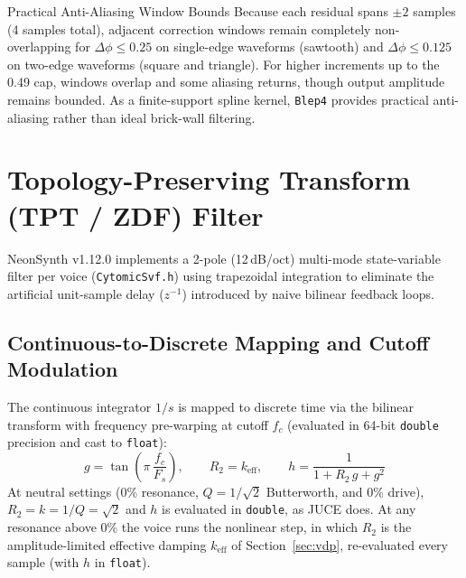 \documentclass[11pt,letterpaper]{article}
\newcommand{\NSVersion}{1.12.0}
\newcommand{\code}[1]{\texttt{\textcolor{codegray}{#1}}}
\newcommand{\Fs}{F_s}
\begin{document}
\begin{callout}{Practical Anti-Aliasing Window Bounds}
Because each residual spans $\pm 2$ samples (4 samples total), adjacent correction windows remain completely
non-overlapping for $\Delta\phi \le 0.25$ on single-edge waveforms (sawtooth) and $\Delta\phi \le 0.125$ on two-edge waveforms
(square and triangle). For higher increments up to the 0.49 cap, windows overlap and some aliasing returns,
though output amplitude remains bounded. As a finite-support spline kernel, \code{Blep4} provides practical
anti-aliasing rather than ideal brick-wall filtering.
\end{callout}

\newpage
\section{Topology-Preserving Transform (TPT / ZDF) Filter}\label{sec:tpt}

NeonSynth v\NSVersion{} implements a 2-pole (12\,dB/oct) multi-mode state-variable filter per voice (\code{CytomicSvf.h})
using trapezoidal integration to eliminate the artificial unit-sample delay ($z^{-1}$) introduced by naive bilinear feedback
loops.

\subsection{Continuous-to-Discrete Mapping and Cutoff Modulation}

The continuous integrator $1/s$ is mapped to discrete time via the bilinear transform with frequency pre-warping at
cutoff $f_c$ (evaluated in 64-bit \code{double} precision and cast to \code{float}):
\begin{equation}\label{eq:tpt}
  g = \tan\!\left(\pi\,\frac{f_c}{\Fs}\right), \qquad R_2 = k_{\mathrm{eff}}, \qquad h = \frac{1}{1 + R_2\,g + g^2}
\end{equation}
At neutral settings (0\% resonance, $Q = 1/\sqrt{2}$ Butterworth, and 0\% drive), $R_2 = k = 1/Q = \sqrt{2}$ and $h$ is
evaluated in \code{double}, as JUCE does. At any resonance above 0\% the voice runs the nonlinear step, in which $R_2$ is the
amplitude-limited effective damping $k_{\mathrm{eff}}$ of Section~\ref{sec:vdp}, re-evaluated every sample (with $h$ in \code{float}).
\end{document}
